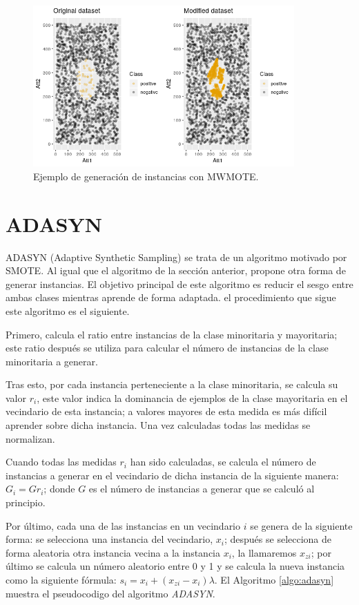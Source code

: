 \begin{figure}[H]
	\centering
	\includegraphics[width=100mm]{imagenes/MWMOTE_comparison.png}
	\caption{Ejemplo de generación de instancias con MWMOTE.}
	\label{fig:42}
\end{figure}
\verticalspace

\section{ADASYN}
ADASYN (Adaptive Synthetic Sampling) \cite{he2008adasyn} se trata de un algoritmo motivado por SMOTE. Al igual que el algoritmo de la sección anterior, propone otra forma de generar instancias. El objetivo principal de este algoritmo es reducir el sesgo entre ambas clases mientras aprende de forma adaptada. el procedimiento que sigue este algoritmo es el siguiente.\newline

Primero, calcula el ratio entre instancias de la clase minoritaria y mayoritaria; este ratio después se utiliza para calcular el número de instancias de la clase minoritaria a generar.\newline

Tras esto, por cada instancia perteneciente a la clase minoritaria, se calcula su valor $r_i$, este valor indica la dominancia de ejemplos de la clase mayoritaria en el vecindario de esta instancia; a valores mayores de esta medida es más difícil aprender sobre dicha instancia. Una vez calculadas todas las medidas se normalizan.\newline

Cuando todas las medidas $r_i$ han sido calculadas, se calcula el número de instancias a generar en el vecindario de dicha instancia de la siguiente manera: $G_i = G r_i$; donde $G$ es el número de instancias a generar que se calculó al principio.\newline
\newpage

Por último, cada una de las instancias en un vecindario $i$ se genera de la siguiente forma: se selecciona una instancia del vecindario, $x_i$; después se selecciona de forma aleatoria otra instancia vecina a la instancia $x_i$, la llamaremos $x_{zi}$; por último se calcula un número aleatorio entre 0 y 1 y se calcula la nueva instancia como la siguiente fórmula: $ s_i = x_i + (x_{zi}-x_i)\lambda$. El Algoritmo \ref{algo:adasyn} muestra el pseudocodigo del algoritmo \textit{ADASYN}.

